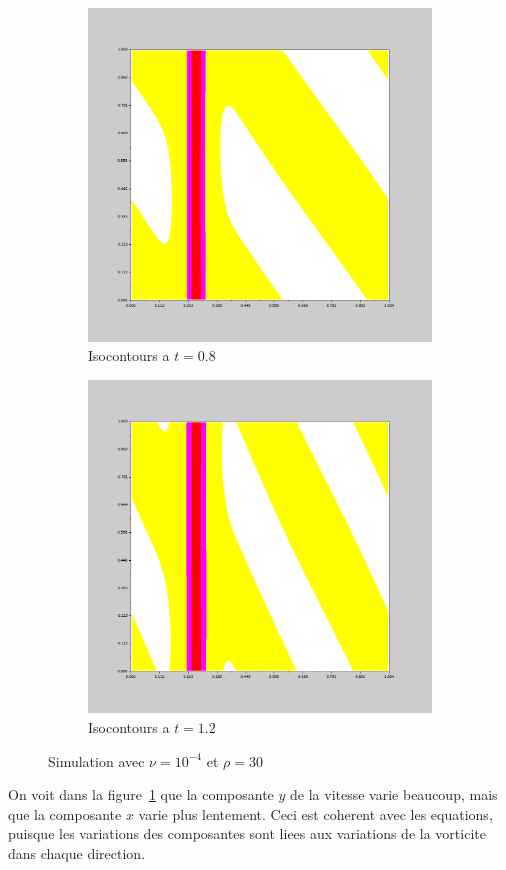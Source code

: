 \documentclass{article}
\begin{document}
\begin{figure}
	\begin{subfigure}{0.3\textwidth}
		\includegraphics[width=\textwidth]{isocontours_simu_1_0,8.png}
		\caption{Isocontours a $t=0.8$}
	\end{subfigure}
	\begin{subfigure}{0.3\textwidth}
		\includegraphics[width=\textwidth]{isocontours_simu_1_1,2.png}
		\caption{Isocontours a $t=1.2$}
	\end{subfigure}
	\caption{Simulation avec $\nu=10^{-4}$ et $\rho=30$}\label{fig:sim1}
\end{figure}
On voit dans la figure~\ref{fig:sim1} que la composante $y$ de la vitesse varie beaucoup, mais que la composante $x$ varie plus lentement. Ceci est coherent avec les equations, puisque les variations des composantes sont liees aux variations de la vorticite dans chaque direction.
\end{document}
